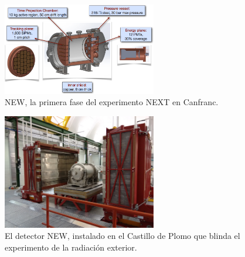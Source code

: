 \begin{figure}
\centering
\includegraphics[width=0.6\textwidth]{img/NEW.png}
\caption{\small NEW, la primera fase del experimento NEXT en Canfranc.} \label{fig:NEW}
\end{figure} 

\begin{figure}
\centering

\includegraphics[width=0.6\textwidth]{img/NewCastle.png}
\caption{\small El detector NEW, instalado en el Castillo de Plomo que blinda el experimento de la radiación exterior.} \label{fig.NewCastle}
\end{figure} 

